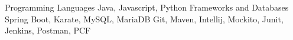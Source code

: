 





\begin{cvskills}
    \cvskill
        {Programming Languages}
        {Java, Javascript, Python}
    \cvskill
        {Frameworks and Databases}
        {Spring Boot, Karate, MySQL, MariaDB}
        {Git, Maven, Intellij, Mockito, Junit, Jenkins, Postman, PCF}
\end{cvskills}